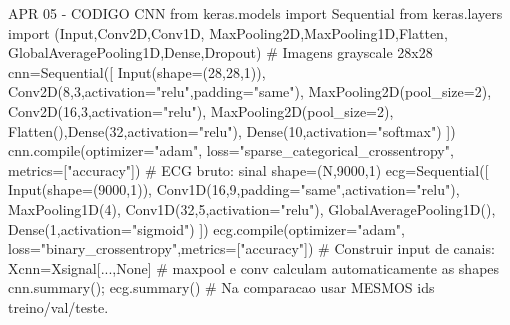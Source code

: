 APR 05 - CODIGO CNN
from keras.models import Sequential
from keras.layers import (Input,Conv2D,Conv1D,
 MaxPooling2D,MaxPooling1D,Flatten,
 GlobalAveragePooling1D,Dense,Dropout)
# Imagens grayscale 28x28
cnn=Sequential([
 Input(shape=(28,28,1)),
 Conv2D(8,3,activation="relu",padding="same"),
 MaxPooling2D(pool_size=2),
 Conv2D(16,3,activation="relu"),
 MaxPooling2D(pool_size=2),
 Flatten(),Dense(32,activation="relu"),
 Dense(10,activation="softmax")
])
cnn.compile(optimizer="adam",
 loss="sparse_categorical_crossentropy",
 metrics=["accuracy"])
# ECG bruto: sinal shape=(N,9000,1)
ecg=Sequential([
 Input(shape=(9000,1)),
 Conv1D(16,9,padding="same",activation="relu"),
 MaxPooling1D(4),
 Conv1D(32,5,activation="relu"),
 GlobalAveragePooling1D(),
 Dense(1,activation="sigmoid")
])
ecg.compile(optimizer="adam",
 loss="binary_crossentropy",metrics=["accuracy"])
# Construir input de canais:
Xcnn=Xsignal[...,None]
# maxpool e conv calculam automaticamente as shapes
cnn.summary(); ecg.summary()
# Na comparacao usar MESMOS ids treino/val/teste.
